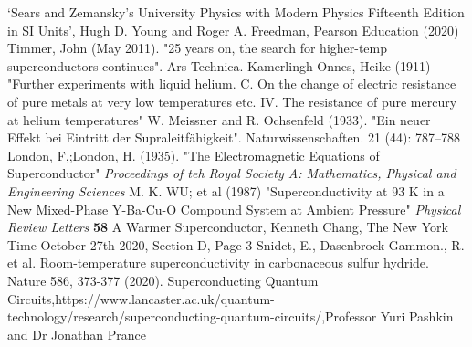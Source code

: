 \documentclass[12pt]{article}
\begin{document}
\begin{thebibliography}{99}
‘Sears and Zemansky’s University Physics with Modern Physics Fifteenth Edition in SI Units’, Hugh
D. Young and Roger A. Freedman, Pearson Education (2020)
 Timmer, John (May 2011). "25 years on, the search for higher-temp superconductors continues". Ars Technica.
 Kamerlingh Onnes, Heike (1911) "Further experiments with liquid helium. C. On the change of electric resistance of pure metals at very low temperatures etc. IV. The resistance of pure mercury at helium temperatures"
 W. Meissner and R. Ochsenfeld (1933). "Ein neuer Effekt bei Eintritt der Supraleitfähigkeit". Naturwissenschaften. 21 (44): 787–788
 London, F,;London, H. (1935). "The Electromagnetic Equations of Superconductor" \textit{Proceedings of teh Royal Society A: Mathematics, Physical and Engineering Sciences}
 M. K. WU; et al (1987) "Superconductivity at 93 K in a New Mixed-Phase Y-Ba-Cu-O Compound System at Ambient Pressure" \textit{Physical Review Letters} \textbf{58} 
 A Warmer Superconductor, Kenneth Chang, The New York Time October 27th 2020, Section D, Page 3
 Snidet, E., Dasenbrock-Gammon., R. et al. Room-temperature superconductivity in carbonaceous sulfur hydride. Nature 586, 373-377 (2020).
 Superconducting Quantum Circuits,https://www.lancaster.ac.uk/quantum-technology/research/superconducting-quantum-circuits/,Professor Yuri Pashkin and  Dr Jonathan Prance
\end{thebibliography}


    
\end{document}

